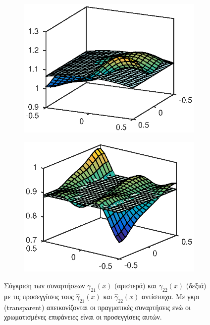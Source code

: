 \begin{figure}
	\begin{subfigure}{0.5\textwidth}
		\includegraphics{plots/experiments/2dof/g21_hat.eps}
	\end{subfigure}
	\begin{subfigure}{0.5\textwidth}
		\includegraphics{plots/experiments/2dof/g22_hat.eps}
	\end{subfigure}
	\caption{Σύγκριση των συναρτήσεων $\gamma_{21}(x)$ (αριστερά) και $\gamma_{22}(x)$ (δεξιά) με τις προσεγγίσεις τους $\hat{\gamma}_{21}(x)$ και $\hat{\gamma}_{22}(x)$ αντίστοιχα. Με γκρι (transparent) απεικονίζονται οι πραγματικές συναρτήσεις ενώ οι χρωματισμένες επιφάνειες είναι οι προσεγγίσεις αυτών. }
	\label{fig:2dof_g2_approximations}
\end{figure}


